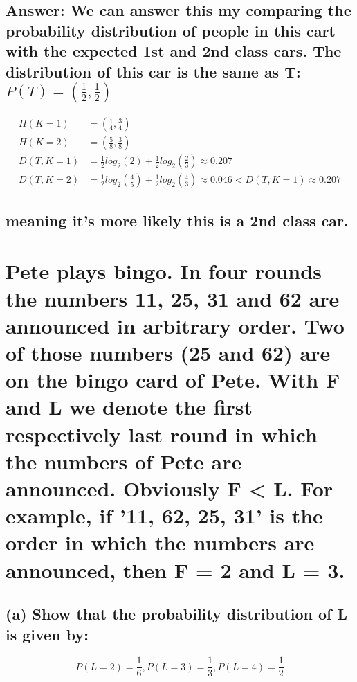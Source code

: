 \documentclass[11px]{article}
\begin{document}
\subsection*{Answer: We can answer this my comparing the probability distribution of people in this cart with the expected 1st and 2nd class cars. The distribution of this car is the same as T: \(P(T) = (\frac{1}{2},\frac{1}{2})\)}

\begin{equation}
\begin{split}
H(K = 1) & = (\frac{1}{4},\frac{3}{4}) \\
H(K = 2) & = (\frac{5}{8},\frac{3}{8}) \\
D(T,K = 1) & = \frac{1}{2}log_2(2) + \frac{1}{2}log_2(\frac{2}{3}) \approx 0.207 \\
D(T,K = 2) & = \frac{1}{2}log_2(\frac{4}{5}) + \frac{1}{2}log_2(\frac{4}{3}) \approx 0.046 < D(T,K = 1) \approx 0.207
\end{split}
\end{equation}

\subsection*{meaning it's more likely this is a 2nd class car.}



\section{\normalfont Pete plays bingo. In four rounds the numbers 11, 25, 31 and 62 are announced in arbitrary order. Two of those numbers (25 and 62) are on the bingo card of Pete. With F and L we denote the first respectively last round in which the numbers of Pete are announced. Obviously F < L. For example, if '11, 62, 25, 31' is the order in which the numbers are announced, then F = 2 and L = 3.}

\subsection*{\normalfont (a) Show that the probability distribution of L is given by:}

\begin{equation}
P(L = 2) = \frac{1}{6}, P(L = 3) = \frac{1}{3}, P(L = 4) = \frac{1}{2}   
\end{equation}
\end{document}

